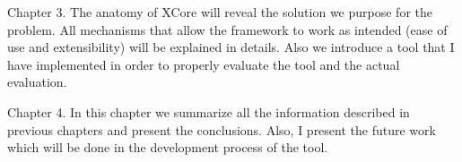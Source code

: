 	Chapter 3.  The anatomy of XCore will reveal the solution we purpose for the 
problem. All mechanisms that allow the framework to work as intended (ease of
use and extensibility) will be explained in details.  Also we introduce a tool
that I have implemented in order to properly evaluate the tool and the actual
evaluation.
	
	Chapter 4.  In this chapter we summarize all the information described in
previous chapters and present the conclusions. Also, I present the future work
which will be done in the development process of the tool.	
	